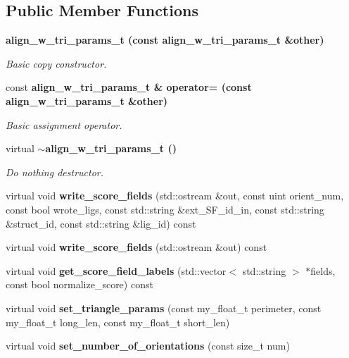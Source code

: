 \subsection*{Public Member Functions}
\begin{CompactItemize}
\item 
\bf{align\_\-w\_\-tri\_\-params\_\-t} (const \bf{align\_\-w\_\-tri\_\-params\_\-t} \&other)\label{classSimSite3D_1_1align__w__tri__params__t_483a34c589f7b8c6ed5ccb0207436910}

\begin{CompactList}\small\item\em Basic copy constructor. \item\end{CompactList}\item 
const \bf{align\_\-w\_\-tri\_\-params\_\-t} \& \bf{operator=} (const \bf{align\_\-w\_\-tri\_\-params\_\-t} \&other)\label{classSimSite3D_1_1align__w__tri__params__t_db03dafc141cf94fc2b71250a00b8fdf}

\begin{CompactList}\small\item\em Basic assignment operator. \item\end{CompactList}\item 
virtual \bf{$\sim$align\_\-w\_\-tri\_\-params\_\-t} ()\label{classSimSite3D_1_1align__w__tri__params__t_09024ddae3c35629a39ffa0a20a50e66}

\begin{CompactList}\small\item\em Do nothing destructor. \item\end{CompactList}\item 
virtual void \textbf{write\_\-score\_\-fields} (std::ostream \&out, const uint orient\_\-num, const bool wrote\_\-ligs, const std::string \&ext\_\-SF\_\-id\_\-in, const std::string \&struct\_\-id, const std::string \&lig\_\-id) const \label{classSimSite3D_1_1align__w__tri__params__t_194cd244292abd6ce90cfc4f0164bcb1}

\item 
virtual void \textbf{write\_\-score\_\-fields} (std::ostream \&out) const \label{classSimSite3D_1_1align__w__tri__params__t_b7e7cb9ab0bf1e0a10801ec8667026cc}

\item 
virtual void \textbf{get\_\-score\_\-field\_\-labels} (std::vector$<$ std::string $>$ $\ast$fields, const bool normalize\_\-score) const \label{classSimSite3D_1_1align__w__tri__params__t_5f779560ad2881c71dc876a58df96763}

\item 
virtual void \textbf{set\_\-triangle\_\-params} (const my\_\-float\_\-t perimeter, const my\_\-float\_\-t long\_\-len, const my\_\-float\_\-t short\_\-len)\label{classSimSite3D_1_1align__w__tri__params__t_067127f641ca7407b5eb01900d0c8ec8}

\item 
virtual void \textbf{set\_\-number\_\-of\_\-orientations} (const size\_\-t num)\label{classSimSite3D_1_1align__w__tri__params__t_f9c57b30b02ee6202689c3a5083b47a6}

\end{CompactItemize}
